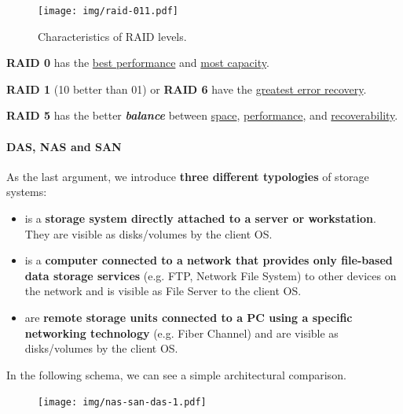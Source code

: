 \newpage

\begin{figure}[!htp]
    \centering
    \texttt{[image: img/raid-011.pdf]}
    \caption{Characteristics of RAID levels.}
\end{figure}

\noindent
\textbf{RAID 0} has the \underline{best performance} and \underline{most capacity}.

\highspace
\textbf{RAID 1} (10 better than 01) or \textbf{RAID 6} have the \underline{greatest error recovery}.

\highspace
\textbf{RAID 5} has the better \textbf{\emph{balance}} between \underline{space}, \underline{performance}, and \underline{recoverability}.

\newpage

\paragraph{DAS, NAS and SAN}\label{paragraph: DAS, NAS and SAN}

As the last argument, we introduce \textbf{three different typologies} of storage systems:
\begin{itemize}
	\item {} is a \textbf{storage system directly attached to a server or workstation}. They are visible as disks/volumes by the client OS.
	
	\item {} is a \textbf{computer connected to a network that provides only file-based data storage services} (e.g. FTP, Network File System) to other devices on the network and is visible as File Server to the client OS.
	
	\item {} are \textbf{remote storage units connected to a PC using a specific networking technology} (e.g. Fiber Channel) and are visible as disks/volumes by the client OS.
\end{itemize}
In the following schema, we can see a simple architectural comparison.
\begin{figure}[!htp]
	\centering
	\texttt{[image: img/nas-san-das-1.pdf]}
\end{figure}

